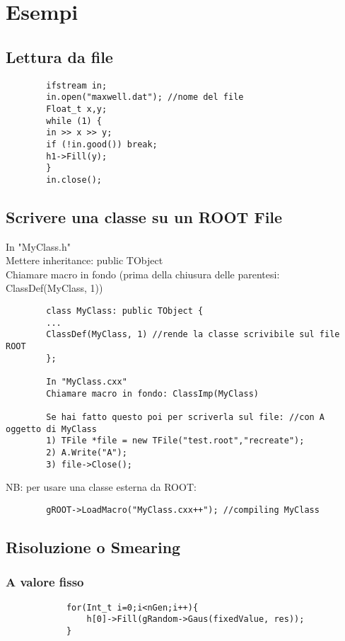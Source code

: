 \documentclass[a4paper]{article}
\begin{document}
\section{Esempi}
    \subsection{Lettura da file}
    \begin{verbatim}
        ifstream in;
        in.open("maxwell.dat"); //nome del file
        Float_t x,y;
        while (1) {
        in >> x >> y;
        if (!in.good()) break;
        h1->Fill(y);
        }
        in.close();
    \end{verbatim}
    \subsection{Scrivere una classe su un ROOT File}
    In "MyClass.h"\\
    Mettere inheritance: public TObject\\
    Chiamare macro in fondo (prima della chiusura delle parentesi: ClassDef(MyClass, 1))\\

    \begin{verbatim}
        class MyClass: public TObject {
        ...
        ClassDef(MyClass, 1) //rende la classe scrivibile sul file ROOT
        }; 

        In "MyClass.cxx"
        Chiamare macro in fondo: ClassImp(MyClass)

        Se hai fatto questo poi per scriverla sul file: //con A oggetto di MyClass
        1) TFile *file = new TFile("test.root","recreate"); 
        2) A.Write("A"); 
        3) file->Close();
    \end{verbatim}
    NB: per usare una classe esterna da ROOT:\\
    \begin{verbatim}
        gROOT->LoadMacro("MyClass.cxx++"); //compiling MyClass
    \end{verbatim}
    \subsection{Risoluzione o Smearing}
        \subsubsection{A valore fisso}
        \begin{verbatim}
            for(Int_t i=0;i<nGen;i++){
                h[0]->Fill(gRandom->Gaus(fixedValue, res));
            }
        \end{verbatim}
\end{document}
